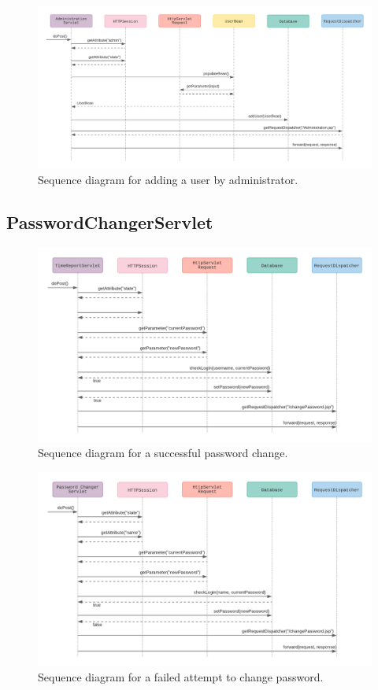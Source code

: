 \documentclass{article}
\begin{document}
\begin{figure}[H]
    \centering
    \includegraphics[scale=0.6]{images/AddUser.png}
    \caption{Sequence diagram for adding a user by administrator.}
    \label{fig:failedLoginAttempt}
\end{figure}

\pagebreak
\subsection{PasswordChangerServlet}

\begin{figure}[h]
    \centering
    \includegraphics[scale=0.6]{images/successfulPasswordChange.png}
    \caption{Sequence diagram for a successful password change.}
    \label{fig:sucessfulPasswordChange}
\end{figure}

\begin{figure}[H]
    \centering
    \includegraphics[scale=0.6]{images/unsuccessfulPasswordChange.png}
    \caption{Sequence diagram for a failed attempt to change password.}
    \label{fig:failedPasswordChange}
\end{figure}
\end{document}
